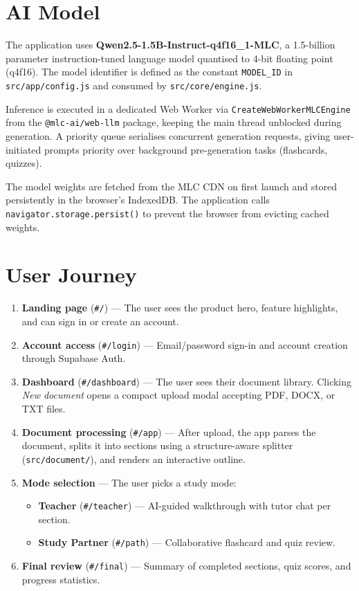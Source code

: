 \documentclass[12pt,a4paper]{article}
\begin{document}
\section{AI Model}

The application uses \textbf{Qwen2.5-1.5B-Instruct-q4f16\_1-MLC}, a 1.5-billion
parameter instruction-tuned language model quantised to 4-bit floating point
(q4f16). The model identifier is defined as the constant \texttt{MODEL\_ID} in
\texttt{src/app/config.js} and consumed by \texttt{src/core/engine.js}.

Inference is executed in a dedicated Web Worker via
\texttt{CreateWebWorkerMLCEngine} from the \texttt{@mlc-ai/web-llm} package,
keeping the main thread unblocked during generation. A priority queue serialises
concurrent generation requests, giving user-initiated prompts priority over
background pre-generation tasks (flashcards, quizzes).

The model weights are fetched from the MLC CDN on first launch and stored
persistently in the browser's IndexedDB. The application calls
\texttt{navigator.storage.persist()} to prevent the browser from evicting cached
weights.

\section{User Journey}

\begin{enumerate}[leftmargin=*, label=\arabic*.]
  \item \textbf{Landing page} (\texttt{\#/}) --- The user sees the product hero,
        feature highlights, and can sign in or create an account.
  \item \textbf{Account access} (\texttt{\#/login}) --- Email/password sign-in
        and account creation through Supabase Auth.
  \item \textbf{Dashboard} (\texttt{\#/dashboard}) --- The user sees their
        document library. Clicking \emph{New document} opens a compact upload
        modal accepting PDF, DOCX, or TXT files.
  \item \textbf{Document processing} (\texttt{\#/app}) --- After upload, the app
        parses the document, splits it into sections using a structure-aware
        splitter (\texttt{src/document/}), and renders an interactive outline.
  \item \textbf{Mode selection} --- The user picks a study mode:
        \begin{itemize}
          \item \textbf{Teacher} (\texttt{\#/teacher}) --- AI-guided walkthrough
                with tutor chat per section.
          \item \textbf{Study Partner} (\texttt{\#/path}) --- Collaborative
                flashcard and quiz review.
        \end{itemize}
  \item \textbf{Final review} (\texttt{\#/final}) --- Summary of completed
        sections, quiz scores, and progress statistics.
\end{enumerate}
\end{document}
